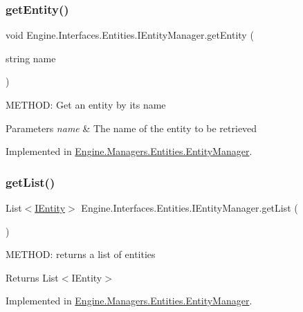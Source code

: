 \subsubsection{\texorpdfstring{get\+Entity()}{getEntity()}}
{\footnotesize\ttfamily void Engine.\+Interfaces.\+Entities.\+I\+Entity\+Manager.\+get\+Entity (\begin{DoxyParamCaption}\item[{string}]{name }\end{DoxyParamCaption})}



M\+E\+T\+H\+OD\+: Get an entity by it\textquotesingle{}s name 


\begin{DoxyParams}{Parameters}
{\em name} & The name of the entity to be retrieved\\
\hline
\end{DoxyParams}


Implemented in \hyperlink{a00518_abeffd88412f79249f333944b45486dff}{Engine.\+Managers.\+Entities.\+Entity\+Manager}.

\mbox{\label{a00442_a8f71921098ae85f7f504f61a399a1bd8}} 
\subsubsection{\texorpdfstring{get\+List()}{getList()}}
{\footnotesize\ttfamily List$<$\hyperlink{a00438}{I\+Entity}$>$ Engine.\+Interfaces.\+Entities.\+I\+Entity\+Manager.\+get\+List (\begin{DoxyParamCaption}{ }\end{DoxyParamCaption})}



M\+E\+T\+H\+OD\+: returns a list of entities 

\begin{DoxyReturn}{Returns}
List$<$\+I\+Entity$>$
\end{DoxyReturn}


Implemented in \hyperlink{a00518_a704e3c8fb916a8bb668ffd30654b4e18}{Engine.\+Managers.\+Entities.\+Entity\+Manager}.

\mbox{\label{a00442_aa341696fc31e28c71448cef613bf7f30}} 
